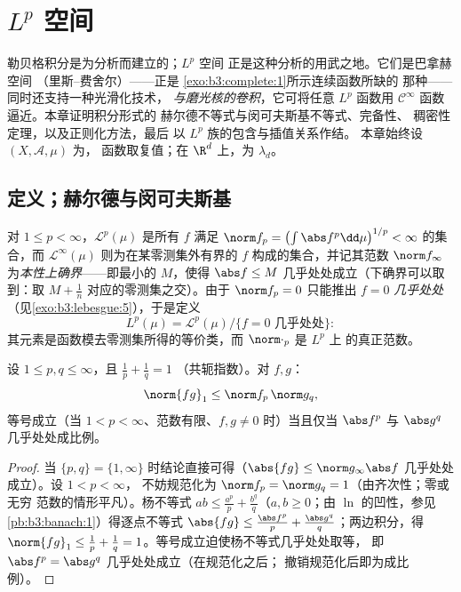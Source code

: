 \chapter{\texorpdfstring{$L^p$}{Lp} 空间}\label{ch:b3:lp}

勒贝格积分是为分析而建立的；$L^p$ 空间
正是这种分析的用武之地。它们是巴拿赫空间
（里斯–费舍尔）——正是
\cref{exo:b3:complete:1}所示连续函数所缺的
那种——同时还支持一种光滑化技术，
\emph{与磨光核的卷积}，它可将任意
$L^p$ 函数用 $\mathcal C^\infty$ 函数逼近。本章证明积分形式的
赫尔德不等式与闵可夫斯基不等式、完备性、
稠密性定理，以及正则化方法，最后
以 $L^p$ 族的包含与插值关系作结。
本章始终设 $(X, \mathcal A, \mu)$ 为，
函数取复值；在 $\R^d$ 上，为
$\lambda_d$。

\section{定义；赫尔德与闵可夫斯基}

\begin{definition}\label{def:b3:lp:space}
对 $1 \leq p < \infty$，$\mathcal L^p(\mu)$ 是所有
 $f$ 满足 $\norm f_p = \bigl(\int\abs
f^p\dd\mu\bigr)^{1/p} < \infty$ 的集合，而 $\mathcal L^\infty(\mu)$
则为在某零测集外有界的 $f$ 构成的集合，并记其范数 $\norm
f_\infty$ 为\emph{本性上确界}——即最小的 $M$，使得
$\abs f \leq M$ 几乎处处成立（下确界可以取到：取
$M + \frac1n$ 对应的零测集之交）。由于 $\norm f_p = 0$ 只能推出 $f
= 0$ \emph{几乎处处}（见\cref{exo:b3:lebesgue:5}），于是定义
\[
L^p(\mu) = \mathcal L^p(\mu)/\{f = 0 \text{ 几乎处处}\} :
\]
其元素是函数模去零测集所得的等价类，而
$\norm\cdot_p$ 是 $L^p$ 上
的真正范数。
\end{definition}

\begin{theorem}[赫尔德不等式]\label{thm:b3:lp:holder}
设 $1 \leq p, q \leq \infty$，且 $\frac1p + \frac1q = 1$
（共轭指数）。对 $f, g$：
\[
\norm{fg}_1 \leq \norm f_p\,\norm g_q ,
\]
等号成立（当 $1 < p < \infty$、范数有限、$f,g\ne0$ 时）当且仅当
$\abs f^p$ 与 $\abs g^q$ 几乎处处成比例。
\end{theorem}

\begin{proof}
当 $\{p, q\} = \{1, \infty\}$ 时结论直接可得（$\abs{fg} \leq
\norm g_\infty\abs f$ 几乎处处成立）。设 $1 < p < \infty$，
不妨规范化为 $\norm f_p = \norm g_q = 1$（由齐次性；零或无穷
范数的情形平凡）。杨不等式 $ab \leq \frac{a^p}p +
\frac{b^q}q$（$a, b \geq 0$；由 $\ln$ 的凹性，参见
\cref{pb:b3:banach:1}）得逐点不等式 $\abs{f g} \leq
\frac{\abs f^p}p + \frac{\abs g^q}q$；两边积分，得 $\norm{fg}_1
\leq \frac1p + \frac1q = 1$。等号成立迫使杨不等式几乎处处取等，
即 $\abs f^p = \abs g^q$ 几乎处处成立（在规范化之后；
撤销规范化后即为成比例）。
\end{proof}


